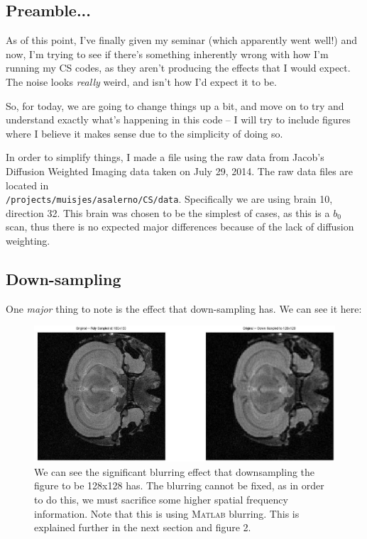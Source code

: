 \documentclass[11 pt]{article}
\newcommand{\matlab}{\textsc{Matlab }}
\begin{document}
  \subsection{Preamble...}

    As of this point, I've finally given my seminar (which apparently went well!) and now, I'm trying to see if there's something inherently wrong with how I'm running my CS codes, as they aren't producing the effects that I would expect. The noise looks \emph{really} weird, and isn't how I'd expect it to be.

    So, for today, we are going to change things up a bit, and move on to try and understand exactly what's happening in this code -- I will try to include figures where I believe it makes sense due to the simplicity of doing so.

    In order to simplify things, I made a file using the raw data from Jacob's Diffusion Weighted Imaging data taken on July 29, 2014. The raw data files are located in \\ \verb!/projects/muisjes/asalerno/CS/data!. Specifically we are using brain 10, direction 32. This brain was chosen to be the simplest of cases, as this is a $b_0$ scan, thus there is no expected major differences because of the lack of diffusion weighting.

  \subsection{Down-sampling}

    One \emph{major} thing to note is the effect that down-sampling has. We can see it here:

    \begin{figure}[h] 

      \centering
      \vspace{0pt}
      \setlength\fboxsep{0pt}
      \setlength\fboxrule{0.5pt}
      \includegraphics[trim = {60mm 100mm 46mm 70mm},clip,scale = 0.4] {Figs/CS_DTI_Sims/FullvsDownSample.eps}
      \caption{We can see the significant blurring effect that downsampling the figure to be 128x128 has. The blurring cannot be fixed, as in order to do this, we must sacrifice some higher spatial frequency information. Note that this is using \matlab blurring. This is explained further in the next section and figure 2.}
      \label{fig:dwnsamp}

      \end{figure}
\end{document}

